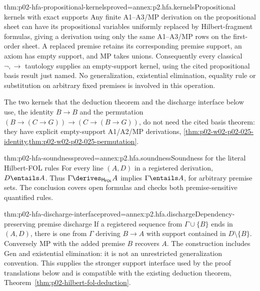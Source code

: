 \begin{hblemma}{thm:p02-hfa-propositional-kernels}{proved=annex:p2.hfa.kernels}{Propositional kernels with exact supports}
Any finite A1--A3/MP derivation on the propositional sheet can have its
propositional variables uniformly replaced by Hilbert-fragment formulas,
giving a derivation using only the same A1--A3/MP rows on the first-order
sheet. A replaced premise retains its corresponding premise support, an
axiom has empty support, and MP takes unions. Consequently every
classical \(\neg,\to\) tautology supplies an empty-support kernel,
using the cited propositional basis result just named. No generalization,
existential elimination, equality rule or substitution on arbitrary
fixed premises is involved in this operation.
\end{hblemma}

The two kernels that the deduction theorem and the discharge interface below
use, the identity \(B\to B\) and the permutation
\((B\to(C\to G))\to(C\to(B\to G))\), do not need the cited basis theorem:
they have explicit empty-support A1/A2/MP derivations,
\cref{thm:p02-w02-p02-025-identity,thm:p02-w02-p02-025-permutation}.

\begin{hbtheorem}{thm:p02-hfa-soundness}{proved=annex:p2.hfa.soundness}{Soundness for the literal Hilbert-FOL rules}
For every line \((A,D)\) in a registered derivation, \(D\entails A\).
Thus \(\Gamma\derives_{\mathsf H_{\mathsf{FOL}}}A\) implies
\(\Gamma\entails A\), for arbitrary premise sets. The conclusion covers
open formulas and checks both premise-sensitive quantified rules.
\end{hbtheorem}

\begin{hblemma}{thm:p02-hfa-discharge-interface}{proved=annex:p2.hfa.discharge}{Dependency-preserving premise discharge}
If a registered sequence from \(\Gamma\cup\{B\}\) ends in
\((A,D)\), there is one from \(\Gamma\) deriving \(B\to A\)
with support contained in \(D\setminus\{B\}\). Conversely MP with
the added premise \(B\) recovers \(A\). The construction includes
Gen and existential elimination: it is not an unrestricted
generalization convention. This supplies the stronger support interface
used by the proof translations below and is compatible with the existing
deduction theorem, Theorem~\ref{thm:p02-hilbert-fol-deduction}.
\end{hblemma}

